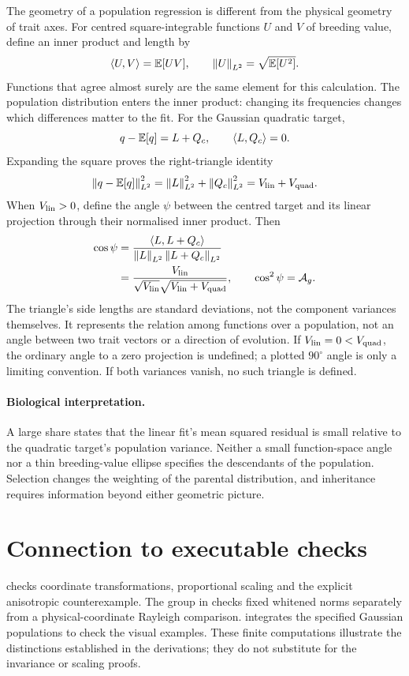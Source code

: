 The geometry of a population regression is different from the physical
geometry of trait axes. For centred square-integrable functions $U$ and
$V$ of breeding value, define an inner product and length by
\[
\langle U,V\rangle=\mathbb E[UV],
\qquad \left\lVert U\right\rVert_{L^2}=\sqrt{\mathbb E[U^2]}.
\]
Functions that agree almost surely are the same element for this
calculation. The population distribution enters the inner product:
changing its frequencies changes which differences matter to the fit.
For the Gaussian quadratic target,
\[
q-\mathbb E[q]=L+Q_c,
\qquad \langle L,Q_c\rangle=0.
\]
Expanding the square proves the right-triangle identity
\begin{equation}
\left\lVert q-\mathbb E[q]\right\rVert_{L^2}^2
 =\left\lVert L\right\rVert_{L^2}^2+\left\lVert Q_c\right\rVert_{L^2}^2
 =V_{\mathrm{lin}}+V_{\mathrm{quad}}.
\label{geometry:pythagorean_projection}
\end{equation}
When $V_{\mathrm{lin}}>0$, define the angle $\psi$ between the centred target and
its linear projection through their normalised inner product. Then
\begin{align}
\cos\psi
 &=\frac{\langle L,L+Q_c\rangle}
         {\left\lVert L\right\rVert_{L^2}\left\lVert L+Q_c\right\rVert_{L^2}}\nonumber\\
 &=\frac{V_{\mathrm{lin}}}{\sqrt{V_{\mathrm{lin}}}\sqrt{V_{\mathrm{lin}}+V_{\mathrm{quad}}}},
\qquad \cos^2\psi=\mathcal A_g.
\label{geometry:angle_share}
\end{align}
The triangle's side lengths are standard deviations, not the component
variances themselves. It represents the relation among functions over a
population, not an angle between two trait vectors or a direction of
evolution. If $V_{\mathrm{lin}}=0<V_{\mathrm{quad}}$, the ordinary angle to a zero projection
is undefined; a plotted $90^\circ$ angle is only a limiting convention.
If both variances vanish, no such triangle is defined.

\paragraph{Biological interpretation.}
A large share states that the linear fit's mean squared residual is small
relative to the quadratic target's population variance. Neither a small function-space
angle nor a thin breeding-value ellipse specifies the descendants of the
population. Selection changes the weighting of the parental distribution,
and inheritance requires information beyond either geometric picture.

\section{Connection to executable checks}

 checks coordinate
transformations, proportional scaling and the explicit anisotropic
counterexample. The  group in
 checks fixed
whitened norms separately from a physical-coordinate Rayleigh comparison.
 integrates the
specified Gaussian populations to check the visual examples. These
finite computations illustrate the distinctions established in the
derivations; they do not substitute for the invariance or scaling proofs.
